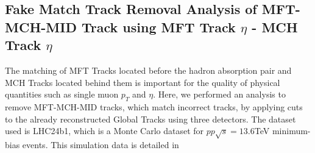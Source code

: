             \subsection{Fake Match Track Removal Analysis of MFT-MCH-MID Track using MFT Track $\eta$ - MCH Track $\eta$}
            \label{Analysis:Matching}
                The matching of MFT Tracks located before the hadron absorption pair and MCH Tracks located behind them is important for the quality of physical quantities such as single muon $p_T$ and $\eta$. Here, we performed an analysis to remove MFT-MCH-MID tracks, which match incorrect tracks, by applying cuts to the already reconstructed Global Tracks using three detectors. The dataset used is LHC24b1, which is a Monte Carlo dataset for $pp\sqrt{s}=13.6$TeV minimum-bias events. This simulation data is detailed in %
                
